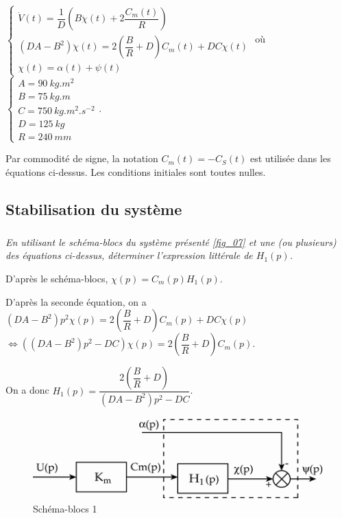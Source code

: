 \documentclass[10pt,fleqn]{article} %
\begin{document}
$
\left\{
\begin{array}{l}
\dot{V}(t) = \dfrac{1}{D} \left(B\ddot{\chi}(t)+2\dfrac{C_m(t)}{R}\right) \\
\left(DA -B^2 \right) \ddot{\chi}(t) = 2\left(\dfrac{B}{R}+D\right)C_m(t) + DC\chi(t) \\
\chi(t)=\alpha(t)+\psi(t) 
 \end{array}
\right.
$
où 
$
\left\{
\begin{array}{l}
A = \SI{90}{kg.m^2} \\
B = \SI{75}{kg.m} \\
C = \SI{750}{kg.m^2.s^{-2}} \\
D = \SI{125}{kg} \\
R = \SI{240}{mm} 
\end{array}
\right.
$.


Par commodité de signe, la notation $C_m(t)=-C_S(t)$ est utilisée dans les équations ci-dessus. Les conditions initiales sont toutes nulles.

\fi

\subsection{Stabilisation du système}
\subparagraph{\label{q_23}}\textit{En utilisant le schéma-blocs du système présenté \autoref{fig_07} et une (ou plusieurs) des équations ci-dessus, déterminer l’expression littérale de $H_1(p)$.}

\ifprof
\begin{corrige}
D'après le schéma-blocs, $\chi(p) =C_m(p)H_1(p)$.

D'après la seconde équation, on a 
$\left(DA -B^2 \right) p^2{\chi}(p) = 2\left(\dfrac{B}{R}+D\right)C_m(p) + DC\chi(p)$
$ \Leftrightarrow \left(\left(DA -B^2 \right) p^2 -  DC \right){\chi}(p) = 2\left(\dfrac{B}{R}+D\right)C_m(p) $.

On a donc $H_1(p)=\dfrac{ 2\left(\dfrac{B}{R}+D\right)}{\left(DA -B^2 \right) p^2 -  DC}$.



\end{corrige}
\else
\fi

\ifprof
\else
\begin{figure}[H]
\centering
\includegraphics[width=0.6\linewidth]{fig_07}
\caption{Schéma-blocs 1 \label{fig_07}}
\end{figure}
\fi
\end{document}
